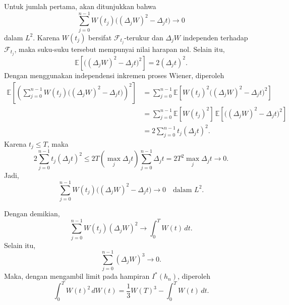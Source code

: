 \documentclass[aspectratio=169,11pt]{beamer}
\theoremstyle{definition}
\begin{document}
\begin{frame}[allowframebreaks]{\insertsection}{\insertsubsection}
  Untuk jumlah pertama, akan ditunjukkan bahwa
  \[
    \sum_{j=0}^{n-1} W(t_j)\bigl((\Delta_j W)^2-\Delta_j t\bigr)
    \longrightarrow 0
  \]
  dalam $L^2$. Karena $W(t_j)$ bersifat $\mathcal{F}_{t_j}$-terukur dan
  $\Delta_j W$ independen terhadap $\mathcal{F}_{t_j}$, maka suku-suku tersebut
  mempunyai nilai harapan nol. Selain itu,
  \[
    \mathbb{E}\left[
      \bigl((\Delta_j W)^2-\Delta_j t\bigr)^2
      \right]
    =
    2(\Delta_j t)^2.
  \]
  Dengan menggunakan independensi inkremen proses Wiener, diperoleh
  \[
    \begin{aligned}
      \mathbb{E}\left[
                  \left(
                  \sum_{j=0}^{n-1}
                  W(t_j)\bigl((\Delta_j W)^2-\Delta_j t\bigr)
                  \right)^2
                  \right]
       & =
      \sum_{j=0}^{n-1}
      \mathbb{E}\left[
                  W(t_j)^2
                  \bigl((\Delta_j W)^2-\Delta_j t\bigr)^2
                  \right] \\
       & =
      \sum_{j=0}^{n-1}
      \mathbb{E}[W(t_j)^2]\,
      \mathbb{E}\left[
                  \bigl((\Delta_j W)^2-\Delta_j t\bigr)^2
                  \right] \\
       & =
      2\sum_{j=0}^{n-1} t_j(\Delta_j t)^2.
    \end{aligned}
  \]
  Karena $t_j\leq T$, maka
  \[
    2\sum_{j=0}^{n-1} t_j(\Delta_j t)^2
    \leq
    2T\left(\max_j\Delta_j t\right)
    \sum_{j=0}^{n-1}\Delta_j t
    =
    2T^2\max_j\Delta_j t
    \longrightarrow 0.
  \]
  Jadi,
  \[
    \sum_{j=0}^{n-1}
    W(t_j)\bigl((\Delta_j W)^2-\Delta_j t\bigr)
    \longrightarrow 0
    \quad \text{dalam } L^2.
  \]

  Dengan demikian,
  \[
    \sum_{j=0}^{n-1}W(t_j)(\Delta_j W)^2
    \longrightarrow
    \int_0^T W(t)\,dt.
  \]
  Selain itu,
  \[
    \sum_{j=0}^{n-1}(\Delta_j W)^3
    \longrightarrow 0.
  \]
  Maka, dengan mengambil limit pada hampiran $I^*(h_n)$, diperoleh
  \[
    \int_0^T W(t)^2\,dW(t)
    =
    \frac{1}{3}W(T)^3
    -
    \int_0^T W(t)\,dt.
  \]
\end{frame}



\end{document}
